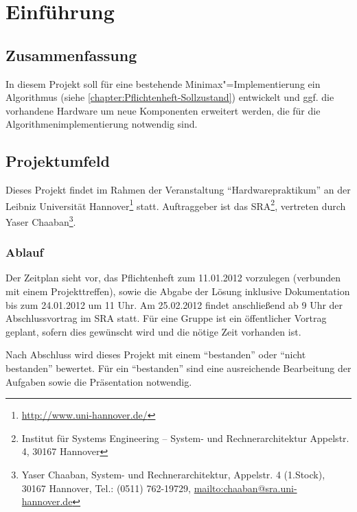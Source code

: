 \chapter{Einführung}
\label{chapter:Pflichtenheft-Einfuehrung}

\section{Zusammenfassung}
\label{section:Pflichtenheft-Einfuehrung-Zusammenfassung}

In diesem Projekt soll für eine bestehende Minimax"=Implementierung ein Algorithmus (siehe \autoref{chapter:Pflichtenheft-Sollzustand}) entwickelt und ggf. die vorhandene Hardware um neue Komponenten erweitert werden, die für die Algorithmenimplementierung notwendig sind.

\section{Projektumfeld}
\label{section:Pflichtenheft-Einfuehrung-Projektumfeld}

Dieses Projekt findet im Rahmen der Veranstaltung "`Hardwarepraktikum"' an der Leibniz Universität Hannover\footnote{\url{http://www.uni-hannover.de/}} statt. Auftraggeber ist das SRA\footnote{Institut für Systems Engineering -- System- und Rechnerarchitektur Appelstr. 4, 30167 Hannover}, vertreten durch Yaser Chaaban\footnote{Yaser Chaaban, System- und Rechnerarchitektur, Appelstr. 4 (1.Stock), 30167 Hannover, Tel.: (0511) 762-19729, \url{mailto:chaaban@sra.uni-hannover.de}}.

\subsection{Ablauf}
\label{subsection:Pflichtenheft-Einfuehrung-Projektumfeld-Ablauf}

Der Zeitplan sieht vor, das Pflichtenheft zum 11.01.2012 vorzulegen (verbunden mit einem Projekttreffen), sowie die Abgabe der Lösung inklusive Dokumentation bis zum 24.01.2012 um 11 Uhr. Am 25.02.2012 findet anschließend ab 9 Uhr der Abschlussvortrag im SRA statt. Für eine Gruppe ist ein öffentlicher Vortrag geplant, sofern dies gewünscht wird und die nötige Zeit vorhanden ist.

Nach Abschluss wird dieses Projekt mit einem "`bestanden"' oder "`nicht bestanden"' bewertet. Für ein "`bestanden"' sind eine ausreichende Bearbeitung der Aufgaben sowie die Präsentation notwendig.

